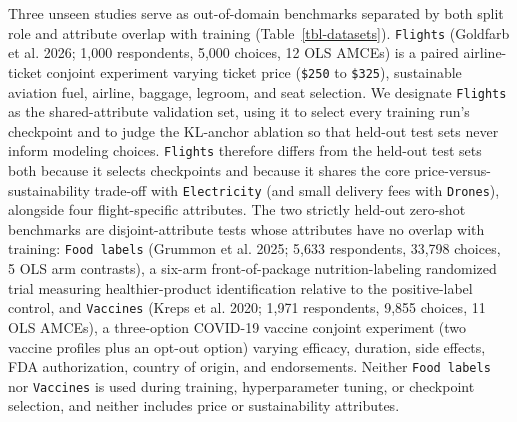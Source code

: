 \documentclass[
  11pt,
  letterpaper,
]{article}
\begin{document}
Three unseen studies serve as out-of-domain benchmarks separated by both
split role and attribute overlap with training
(Table~\ref{tbl-datasets}). \texttt{Flights} (Goldfarb et al. 2026;
1,000 respondents, 5,000 choices, 12 OLS AMCEs) is a paired
airline-ticket conjoint experiment varying ticket price (\texttt{\$250}
to \texttt{\$325}), sustainable aviation fuel, airline, baggage,
legroom, and seat selection. We designate \texttt{Flights} as the
shared-attribute validation set, using it to select every training run's
checkpoint and to judge the KL-anchor ablation so that held-out test
sets never inform modeling choices. \texttt{Flights} therefore differs
from the held-out test sets both because it selects checkpoints and
because it shares the core price-versus-sustainability trade-off with
\texttt{Electricity} (and small delivery fees with \texttt{Drones}),
alongside four flight-specific attributes. The two strictly held-out
zero-shot benchmarks are disjoint-attribute tests whose attributes have
no overlap with training: \texttt{Food\ labels} (Grummon et al. 2025;
5,633 respondents, 33,798 choices, 5 OLS arm contrasts), a six-arm
front-of-package nutrition-labeling randomized trial measuring
healthier-product identification relative to the positive-label control,
and \texttt{Vaccines} (Kreps et al. 2020; 1,971 respondents, 9,855
choices, 11 OLS AMCEs), a three-option COVID-19 vaccine conjoint
experiment (two vaccine profiles plus an opt-out option) varying
efficacy, duration, side effects, FDA authorization, country of origin,
and endorsements. Neither \texttt{Food\ labels} nor \texttt{Vaccines} is
used during training, hyperparameter tuning, or checkpoint selection,
and neither includes price or sustainability attributes.
\end{document}
